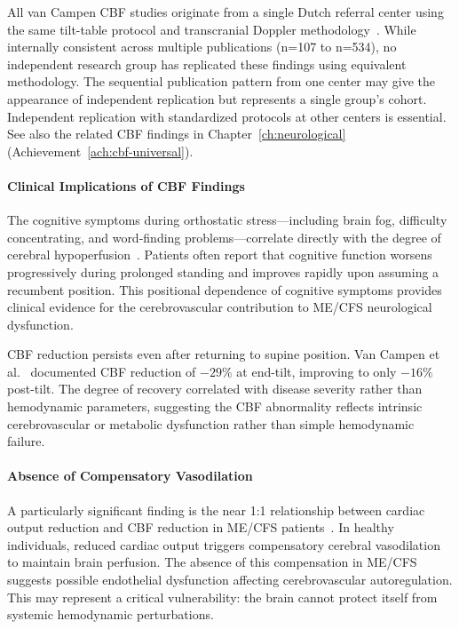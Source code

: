 \begin{warning}
All van Campen CBF studies originate from a single Dutch referral center using the same tilt-table protocol and transcranial Doppler methodology~\cite{VanCampenEtAl2020,VanCampenEtAl2021,VanCampenEtAl2023,VanCampenEtAl2024}. While internally consistent across multiple publications (n=107 to n=534), no independent research group has replicated these findings using equivalent methodology. The sequential publication pattern from one center may give the appearance of independent replication but represents a single group's cohort. Independent replication with standardized protocols at other centers is essential. See also the related CBF findings in Chapter~\ref{ch:neurological} (Achievement~\ref{ach:cbf-universal}).
\end{warning}

\paragraph{Clinical Implications of CBF Findings}

The cognitive symptoms during orthostatic stress---including brain fog, difficulty concentrating, and word-finding problems---correlate directly with the degree of cerebral hypoperfusion~\cite{VanCampenEtAl2023}. Patients often report that cognitive function worsens progressively during prolonged standing and improves rapidly upon assuming a recumbent position. This positional dependence of cognitive symptoms provides clinical evidence for the cerebrovascular contribution to ME/CFS neurological dysfunction.

\begin{observation}
\label{obs:cbf-recovery}
CBF reduction persists even after returning to supine position. Van Campen et al.~\cite{VanCampenEtAl2021} documented CBF reduction of $-29\%$ at end-tilt, improving to only $-16\%$ post-tilt. The degree of recovery correlated with disease severity rather than hemodynamic parameters, suggesting the CBF abnormality reflects intrinsic cerebrovascular or metabolic dysfunction rather than simple hemodynamic failure.
\end{observation}

\paragraph{Absence of Compensatory Vasodilation}

A particularly significant finding is the near 1:1 relationship between cardiac output reduction and CBF reduction in ME/CFS patients~\cite{VanCampenEtAl2024}. In healthy individuals, reduced cardiac output triggers compensatory cerebral vasodilation to maintain brain perfusion. The absence of this compensation in ME/CFS suggests possible endothelial dysfunction affecting cerebrovascular autoregulation. This may represent a critical vulnerability: the brain cannot protect itself from systemic hemodynamic perturbations.

